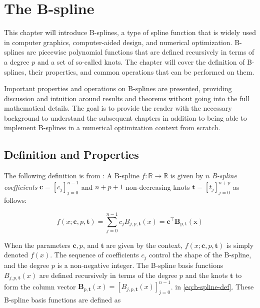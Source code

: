 
\chapter{The B-spline}
\label{chap:b-spline-theory}
This chapter will introduce B-splines, a type of spline function that is widely used in computer graphics, computer-aided design, and numerical optimization. B-splines are piecewise polynomial functions that are defined recursively in terms of a degree $p$ and a set of so-called knots. The chapter will cover the definition of B-splines, their properties, and common operations that can be performed on them. 

Important properties and operations on B-splines are presented, providing discussion and intuition around results and theorems without going into the full mathematical details. The goal is to provide the reader with the necessary background to understand the subsequent chapters in addition to being able to implement B-splines in a numerical optimization context from scratch.

\section{Definition and Properties}
The following definition is from \cite{Grimstad2016}:
A B-spline $f: \mathbb R \rightarrow \mathbb R$ is given by $n$ \emph{B-spline coefficients} $\mathbf c = [c_j]_{j=0}^{n-1}$ and $n+p+1$ non-decreasing knots $\mathbf t = [t_j]_{j=0}^{n+p}$ as follows:

\begin{equation}\label{eq:b-spline-def}
    f(x ; \mathbf{c}, p, \mathbf{t})=\sum_{j=0}^{n-1} c_j B_{j, p, \mathbf{t}}(x)=\mathbf{c}^{\top} \mathbf{B}_{\mathrm{p}, \mathrm{t}}(\mathrm{x})
\end{equation}

When the parameters $\mathbf{c}, p$, and $\mathbf{t}$ are given by the context, $f(x ; \mathbf{c}, p, \mathbf{t})$ is simply denoted $f(x)$. The sequence of coefficients $c_j$ control the shape of the B-spline, and the degree $p$ is a non-negative integer. The B-spline basis functions $B_{j, p, \mathbf{t}}(x)$ are defined recursively in terms of the degree $p$ and the knots $\mathbf t$ to form the column vector $\mathbf{B}_{p, \mathbf{t}}(x) = [B_{j, p, \mathbf{t}}(x)]_{j=0}^{n-1}$. 
in \cref{eq:b-spline-def}. These B-spline basis functions are defined as

